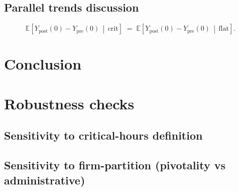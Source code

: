 \documentclass[11pt,a4paper]{article}
\begin{document}
\subsection{Parallel trends discussion}\label{sec:results:pta}

\begin{equation}\label{eq:pta}
   \mathbb{E}\!\left[Y_{\text{post}}(0) - Y_{\text{pre}}(0) \,\middle|\, \mathrm{crit}\right] \;=\; \mathbb{E}\!\left[Y_{\text{post}}(0) - Y_{\text{pre}}(0) \,\middle|\, \mathrm{flat}\right].
\end{equation}


\section{Conclusion}\label{sec:conclusion}


\appendix

\section{Robustness checks}\label{app:robustness}

\subsection{Sensitivity to critical-hours definition}\label{app:critical_hours}

\subsection{Sensitivity to firm-partition (pivotality vs administrative)}\label{app:partition}
\end{document}
